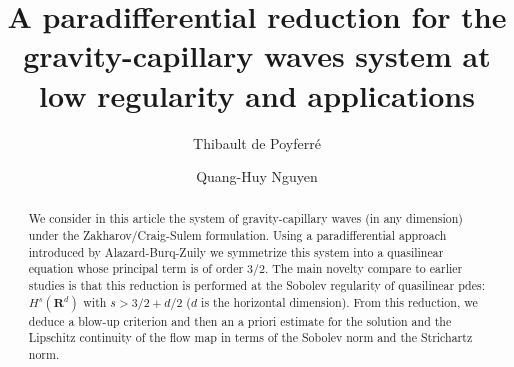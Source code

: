 \documentclass[11pt,english]{smfart}
\title[A paradifferential reduction for the gravity-capillary waves]{A paradifferential reduction for the gravity-capillary waves system at low regularity and applications}
\author{Thibault de Poyferr\'{e}}
\author{Quang-Huy Nguyen}
\date{}
\theoremstyle{plain}
\theoremstyle{definition}
\numberwithin{equation}{section}
\begin{document}
\begin{abstract}
We consider in this article the system of gravity-capillary waves (in any dimension) under the Zakharov/Craig-Sulem formulation. Using a paradifferential approach introduced by Alazard-Burq-Zuily we symmetrize this system into a quasilinear equation whose principal term is of order $3/2$. The main novelty compare to earlier studies is that this reduction is performed at the  Sobolev regularity of quasilinear pdes: $H^s({\mathbf{R}}^d)$ with $s>3/2+d/2$ ($d$ is the horizontal dimension). From this reduction, we deduce a blow-up criterion and then an a priori estimate for the solution and the Lipschitz continuity of the flow map in terms of the Sobolev norm and the Strichartz norm.
\end{abstract}
\maketitle

\tableofcontents
\end{document}
